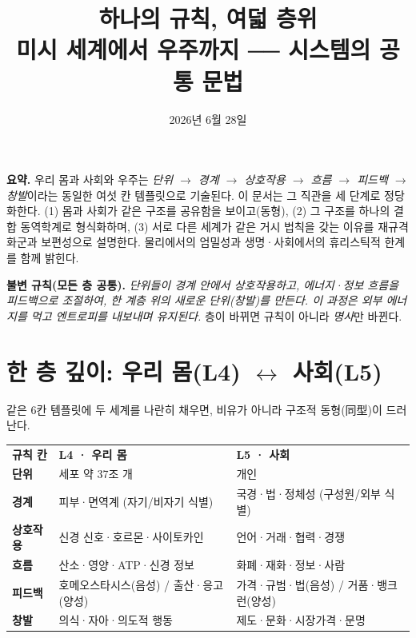 \documentclass[11pt]{article}
\title{\bfseries 하나의 규칙, 여덟 층위\\[0.3em]\large 미시 세계에서 우주까지 ── 시스템의 공통 문법}
\author{}
\date{2026년 6월 28일}
\begin{document}
\maketitle
\thispagestyle{empty}

\noindent\textbf{요약.} 우리 몸과 사회와 우주는 \emph{단위 $\rightarrow$ 경계 $\rightarrow$ 상호작용 $\rightarrow$ 흐름 $\rightarrow$ 피드백 $\rightarrow$ 창발}이라는 동일한 여섯 칸 템플릿으로 기술된다. 이 문서는 그 직관을 세 단계로 정당화한다. (1) 몸과 사회가 같은 구조를 공유함을 보이고(동형), (2) 그 구조를 하나의 결합 동역학계로 형식화하며, (3) 서로 다른 세계가 같은 거시 법칙을 갖는 이유를 재규격화군과 보편성으로 설명한다. 물리에서의 엄밀성과 생명·사회에서의 휴리스틱적 한계를 함께 밝힌다.

\bigskip
\noindent\textbf{불변 규칙(모든 층 공통).} \textit{단위들이 경계 안에서 상호작용하고, 에너지·정보 흐름을 피드백으로 조절하여, 한 계층 위의 새로운 단위(창발)를 만든다. 이 과정은 외부 에너지를 먹고 엔트로피를 내보내며 유지된다.} 층이 바뀌면 규칙이 아니라 \emph{명사}만 바뀐다.

\section{한 층 깊이: 우리 몸(L4) $\leftrightarrow$ 사회(L5)}

같은 6칸 템플릿에 두 세계를 나란히 채우면, 비유가 아니라 구조적 동형(同型)이 드러난다.

\begin{table}[h]
\centering
\footnotesize
\begin{tabularx}{\textwidth}{>{\bfseries}l >{\raggedright\arraybackslash}X >{\raggedright\arraybackslash}X}
\rowcolor{graybg}
\textcolor{graytx}{규칙 칸} & \cellcolor{tealbg}\textcolor{tealtx}{\textbf{L4 · 우리 몸}} & \cellcolor{coralbg}\textcolor{coraltx}{\textbf{L5 · 사회}}\\
단위 & \cellcolor{tealbg}세포 약 37조 개 & \cellcolor{coralbg}개인 \\
경계 & \cellcolor{tealbg}피부·면역계 (자기/비자기 식별) & \cellcolor{coralbg}국경·법·정체성 (구성원/외부 식별) \\
상호작용 & \cellcolor{tealbg}신경 신호·호르몬·사이토카인 & \cellcolor{coralbg}언어·거래·협력·경쟁 \\
흐름 & \cellcolor{tealbg}산소·영양·ATP·신경 정보 & \cellcolor{coralbg}화폐·재화·정보·사람 \\
피드백 & \cellcolor{tealbg}호메오스타시스(음성) / 출산·응고(양성) & \cellcolor{coralbg}가격·규범·법(음성) / 거품·뱅크런(양성) \\
창발 & \cellcolor{tealbg}의식·자아·의도적 행동 & \cellcolor{coralbg}제도·문화·시장가격·문명 \\
\end{tabularx}
\end{table}
\end{document}
